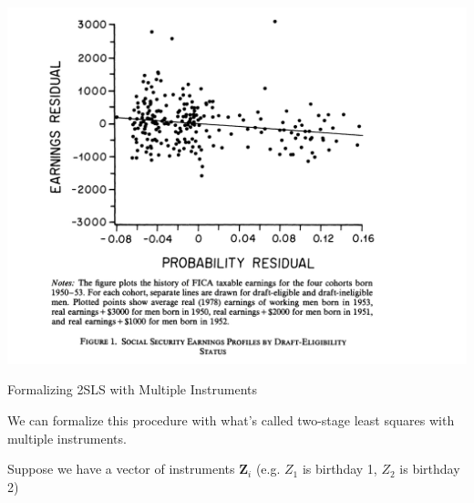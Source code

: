 \documentclass[11pt,english,handout]{beamer}
\newenvironment{wideitemize}{\itemize\addtolength{\itemsep}{10pt}}{\enditemize}
\begin{document}
%
%	
%




\begin{frame}
	\includegraphics[width =0.9 \linewidth]{angrist-plot}
\end{frame}

\begin{frame}{Formalizing 2SLS with Multiple Instruments}
	\begin{wideitemize}
		\item
		We can formalize this procedure with what's called two-stage least squares with multiple instruments. 
		
		\item
		Suppose we have a vector of instruments $\bm{Z}_i$ (e.g. $Z_1$ is birthday 1, $Z_2$ is birthday 2)

\end{wideitemize}
\end{frame}
\end{document}
